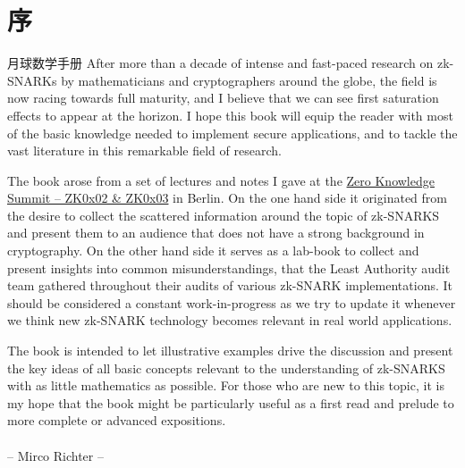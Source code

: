 \chapter*{序}
月球数学手册
After more than a decade of intense and fast-paced research on zk-SNARKs by mathematicians
and cryptographers around the globe, the field is now racing towards full maturity, and I believe that we can see first saturation effects to appear at the horizon. I hope this book will equip the reader with most of the basic knowledge needed to implement secure applications, and to tackle the vast literature in this remarkable field of research.

The book arose from a set of lectures and notes I gave at the \href{https://www.zksummit.com/}{Zero Knowledge Summit – ZK0x02 \& ZK0x03} in Berlin. On the one hand side it originated from the desire to collect the scattered information around the topic of zk-SNARKS and present them to an audience that does not have a strong background in cryptography. On the other hand side it serves as a lab-book to collect and present insights  into common misunderstandings, that the Least Authority audit team gathered throughout their audits of various zk-SNARK implementations. It should be considered a constant work-in-progress as we try to update it whenever we think new zk-SNARK technology becomes relevant in real world applications. 

The book is intended to let illustrative examples drive the discussion and present the key ideas of all basic concepts relevant to the understanding of zk-SNARKS with as little mathematics as possible. For those who are new to this topic, it is my hope that the book might be particularly useful as a first read and prelude to more complete or advanced expositions.
\\
\\
\hspace*{0pt}\hfill -- Mirco Richter --

